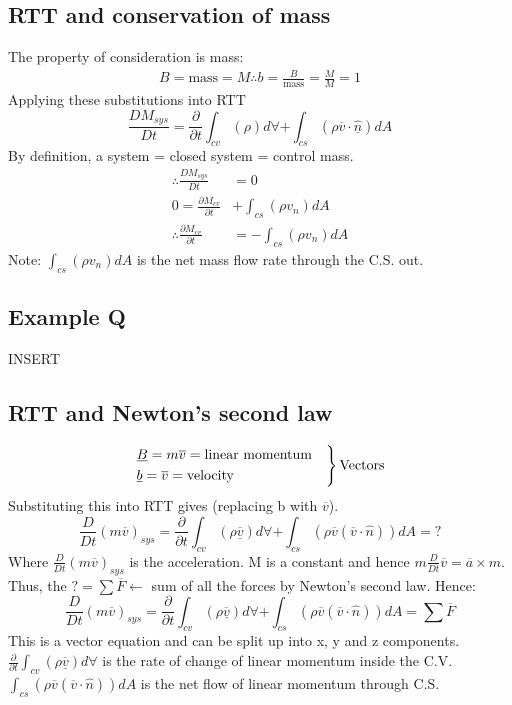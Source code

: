 \subsection{RTT and conservation of mass}
The property of consideration is mass:
\begin{gather}
  B = \textrm{mass} = M
  \therefore b = \frac{B}{\textrm{mass}} = \frac{M}{M} = 1
\end{gather}
Applying these substitutions into RTT
\begin{equation}
  \frac{DM_{sys}}{Dt} = \frac{\partial}{\partial t} \int_{cv} (\rho)d\forall + \int_{cs} (\rho \overline{v} \cdot \underline{\hat{n}}) dA
\end{equation}
By definition, a system = closed system = control mass.
\begin{align}
  \therefore \frac{DM_{sys}}{Dt}                & = 0                         \\
  0 =\frac{\partial M_{cv}}{\partial t}         & + \int_{cs} (\rho v_n) dA   \\
  \therefore \frac{\partial M_{cv}}{\partial t} & = - \int_{cs} (\rho v_n) dA
\end{align}
Note: $\int_{cs} (\rho v_n) dA$ is the net mass flow rate through the C.S. out.
\subsection{Example Q}
INSERT
\subsection{RTT and Newton's second law}
\begin{equation}
  \begin{rcases}
    \underline{B} = m \overline{v} = \textrm{linear momentum} & \\
    \underline{b} = \overline{v} = \textrm{velocity}          &
  \end{rcases} \textrm{Vectors}
\end{equation}
Substituting this into RTT gives (replacing b with $\overline{v}$).
\begin{equation}
  \frac{D}{Dt}(m\overline{v})_{sys} = \frac{\partial}{\partial t} \int_{cv} (\rho \underline{\overline{v}}) d\forall + \int_{cs} (\rho \overline{v} (\overline{v}\cdot \hat{n})) dA = ?
\end{equation}
Where $\frac{D}{Dt}(m\overline{v})_{sys}$ is the acceleration. M is a constant and hence $m\frac{D}{Dt}\overline{v} = \overline{a} \times m$. Thus, the $? = \sum \overline{F} \leftarrow$ sum of all the forces by Newton's second law. Hence:
\begin{equation}
  \frac{D}{Dt} (m \overline{v})_{sys} = \frac{\partial}{\partial t} \int_{cv} (\rho \overline{\underline{v}}) d\forall + \int_{cs} (\rho \overline{v}(\overline{v} \cdot \hat{n})) dA = \sum \overline{F}
\end{equation}
This is a vector equation and can be split up into x, y and z components. $\frac{\partial}{\partial t} \int_{cv} (\rho \overline{\underline{v}}) d\forall$ is the rate of change of linear momentum inside the C.V. $\int_{cs} (\rho \overline{v}(\overline{v} \cdot \hat{n})) dA$ is the net flow of linear momentum through C.S.
